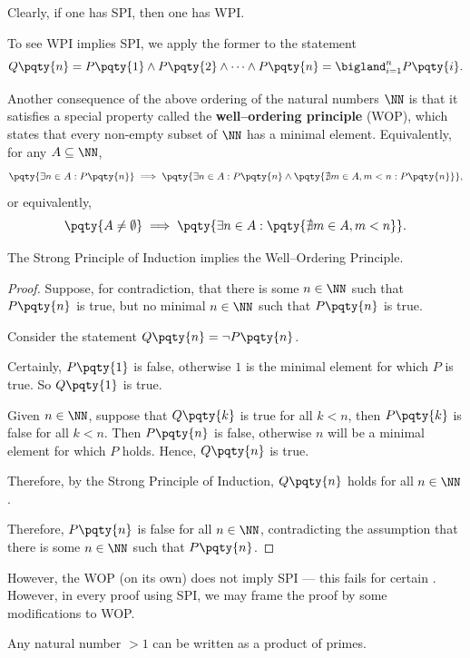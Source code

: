 Clearly, if one has SPI, then one has WPI.

To see WPI implies SPI, we apply the former to the statement
\[
    Q\pqty{n} = P\pqty{1} \land P\pqty{2} \land \cdots \land P\pqty{n} = \bigland_{i = 1}^{n} P\pqty{i}.
\]

Another consequence of the above ordering of the natural numbers \(\NN\) is that it satisfies a special property called the \textbf{well--ordering principle} (WOP), which states that every non-empty subset of \(\NN\) has a minimal element. Equivalently, for any \(A \subseteq \NN\),
\[
    \pqty{\exists n \in A: P\pqty{n}} \implies \pqty{\exists n \in A: P\pqty{n} \land \pqty{\nexists m \in A, m < n: P\pqty{n}}},
\]
or equivalently,
\[
    \pqty{A \neq \emptyset} \implies \pqty{\exists n \in A: \pqty{\nexists m \in A, m < n}}.
\]

\begin{theorem}
    The Strong Principle of Induction implies the Well--Ordering Principle.
\end{theorem}

\begin{proof}
    Suppose, for contradiction, that there is some \(n \in \NN\) such that \(P\pqty{n}\) is true, but no minimal \(n \in \NN\) such that \(P\pqty{n}\) is true.

    Consider the statement \(Q\pqty{n} = \lnot P\pqty{n}\).

    Certainly, \(P\pqty{1}\) is false, otherwise \(1\) is the minimal element for which \(P\) is true. So \(Q\pqty{1}\) is true.

    Given \(n \in \NN\), suppose that \(Q\pqty{k}\) is true for all \(k < n\), then \(P\pqty{k}\) is false for all \(k < n\). Then \(P\pqty{n}\) is false, otherwise \(n\) will be a minimal element for which \(P\) holds. Hence, \(Q\pqty{n}\) is true.

    Therefore, by the Strong Principle of Induction, \(Q\pqty{n}\) holds for all \(n \in \NN\).

    Therefore, \(P\pqty{n}\) is false for all \(n \in \NN\), contradicting the assumption that there is some \(n \in \NN\) such that \(P\pqty{n}\).
\end{proof}

However, the WOP (on its own) does not imply SPI --- this fails for certain . However, in every proof using SPI, we may frame the proof by some modifications to WOP.

\begin{claim}
    Any natural number \(> 1\) can be written as a product of primes.
\end{claim}

